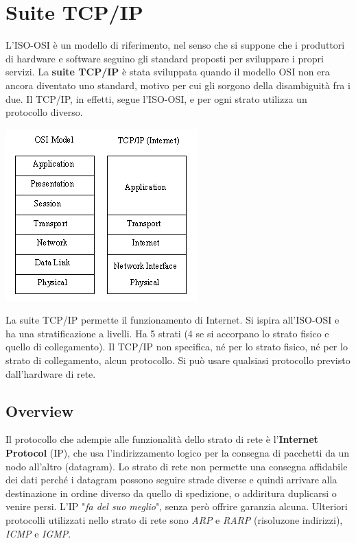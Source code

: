 \section{Suite TCP/IP}
    L'ISO-OSI è un modello di riferimento, nel senso che si suppone che i produttori di hardware e software seguino gli standard proposti per sviluppare i propri servizi. La \textbf{suite TCP/IP} è stata sviluppata quando il modello OSI non era ancora diventato uno standard, motivo per cui gli sorgono della disambiguità fra i due. Il TCP/IP, in effetti, segue l'ISO-OSI, e per ogni strato utilizza un protocollo diverso.

    \begin{center}
        \includegraphics{images/TCP.png}
    \end{center}

    La suite TCP/IP permette il funzionamento di Internet. Si ispira all'ISO-OSI e ha una stratificazione a livelli. Ha 5 strati (4 se si accorpano lo strato fisico e quello di collegamento). Il TCP/IP non specifica, né per lo strato fisico, né per lo strato di collegamento, alcun protocollo. Si può usare qualsiasi protocollo previsto dall'hardware di rete. 

\subsection{Overview}
    Il protocollo che adempie alle funzionalità dello strato di rete è l'\textbf{Internet Protocol} (IP), che usa l'indirizzamento logico per la consegna di pacchetti da un nodo all'altro (datagram). Lo strato di rete non permette una consegna affidabile dei dati perché i datagram possono seguire strade diverse e quindi arrivare alla destinazione in ordine diverso da quello di spedizione, o addiritura duplicarsi o venire persi. 
    L'IP "\textit{fa del suo meglio}", senza però offrire garanzia alcuna. Ulteriori protocolli utilizzati nello strato di rete sono \textit{ARP} e \textit{RARP} (risoluzone indirizzi), \textit{ICMP} e \textit{IGMP}.

